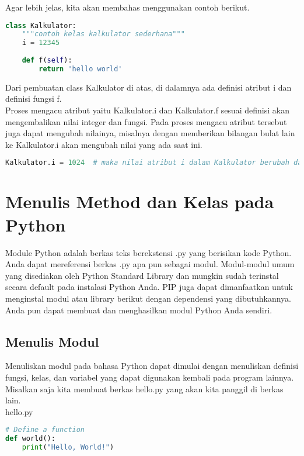Agar lebih jelas, kita akan membahas menggunakan contoh berikut.\\

\begin{lstlisting}[language=Python]
class Kalkulator:
    """contoh kelas kalkulator sederhana"""
    i = 12345
 
    def f(self):
        return 'hello world'
\end{lstlisting}

Dari pembuatan class Kalkulator di atas, di dalamnya ada definisi atribut i dan definisi fungsi f.\\

Proses mengacu atribut yaitu Kalkulator.i dan Kalkulator.f sesuai definisi akan mengembalikan nilai integer dan fungsi. Pada proses mengacu atribut tersebut juga dapat mengubah nilainya, misalnya dengan memberikan bilangan bulat lain ke Kalkulator.i akan mengubah nilai yang ada saat ini.\\
\begin{lstlisting}[language=Python]
Kalkulator.i = 1024  # maka nilai atribut i dalam Kalkulator berubah dari 12345 menjadi 1024
\end{lstlisting}

\section{Menulis Method dan Kelas pada Python}

Module Python adalah berkas teks berekstensi .py yang berisikan kode Python. Anda dapat mereferensi berkas .py apa pun sebagai modul. Modul-modul umum yang disediakan oleh Python Standard Library dan mungkin sudah terinstal secara default pada instalasi Python Anda. PIP juga dapat dimanfaatkan untuk menginstal modul atau library berikut dengan dependensi yang dibutuhkannya. Anda pun dapat membuat dan menghasilkan modul Python Anda sendiri.

\subsection{Menulis Modul}

Menuliskan modul pada bahasa Python dapat dimulai dengan menuliskan definisi fungsi, kelas, dan variabel yang dapat digunakan kembali pada program lainnya. Misalkan saja kita membuat berkas hello.py yang akan kita panggil di berkas lain.\\

hello.py
\begin{lstlisting}[language=Python]
# Define a function
def world():
    print("Hello, World!")
\end{lstlisting}

